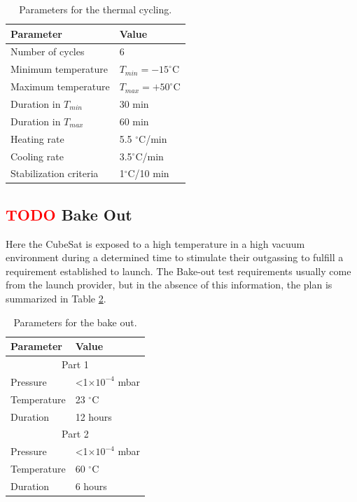 \begin{table}[!htb]
    \centering
    \begin{tabular}{ll}
        \toprule[1.5pt]
        \textbf{Parameter} & \textbf{Value} \\
        \midrule
        Number of cycles        & 6 \\
        Minimum temperature     & $T_{min}=-15 ^\circ$C \\
        Maximum temperature     & $T_{max}=+50 ^\circ$C \\
        Duration in $T_{min}$   & 30 min \\
        Duration in $T_{max}$   & 60 min \\
        Heating rate            & 5.5 $^\circ$C/min \\
        Cooling rate            & 3.5$^\circ$C/min \\
        Stabilization criteria  & 1$^\circ$C/10 min \\
        \bottomrule[1.5pt]
	\end{tabular}
    \caption{Parameters for the thermal cycling.}
    \label{tab:thermal_cycling}
\end{table}

\subsection{ \textcolor{red}{TODO} Bake Out}

Here the CubeSat is exposed to a high temperature in a high vacuum environment during a determined time to stimulate their outgassing to fulfill a requirement established to launch. The Bake-out test requirements usually come from the launch provider, but in the absence of this information, the plan is summarized in Table \ref{tab:bakeout_cycling}. %

\begin{table}[!htb]
    \centering
    \begin{tabular}{ll}
    \toprule[1.5pt]
    \textbf{Parameter} & \textbf{Value} \\
    \midrule
    \multicolumn{2}{c}{Part 1} \\
    \midrule
    Pressure           & <1$\times 10^{-4}$ mbar \\
    Temperature        & 23 $^\circ$C \\
    Duration           & 12 hours \\
    \midrule
    \multicolumn{2}{c}{Part 2} \\
    \midrule
    Pressure           & <1$\times 10^{-4}$ mbar \\
    Temperature        & 60 $^\circ$C \\
    Duration           & 6 hours \\
    \bottomrule[1.5pt]
    \end{tabular}
    \caption{Parameters for the bake out.}
    \label{tab:bakeout_cycling}
\end{table}

